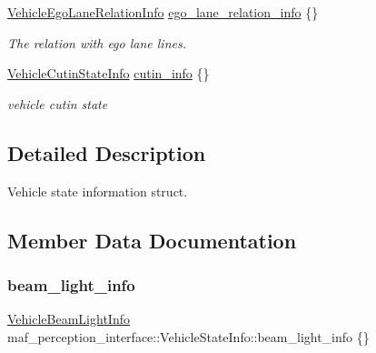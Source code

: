 \begin{DoxyCompactItemize}
\hyperlink{structmaf__perception__interface_1_1VehicleEgoLaneRelationInfo}{Vehicle\+Ego\+Lane\+Relation\+Info} \hyperlink{structmaf__perception__interface_1_1VehicleStateInfo_a336db2b29db8d0e7387dfa075b161c7f}{ego\+\_\+lane\+\_\+relation\+\_\+info} \{\}
\begin{DoxyCompactList}\small\item\em The relation with ego lane lines. \end{DoxyCompactList}\item 
\hyperlink{structmaf__perception__interface_1_1VehicleCutinStateInfo}{Vehicle\+Cutin\+State\+Info} \hyperlink{structmaf__perception__interface_1_1VehicleStateInfo_acc379f2e13a4f3c7ac26783fcc2c56c4}{cutin\+\_\+info} \{\}
\begin{DoxyCompactList}\small\item\em vehicle cutin state \end{DoxyCompactList}\end{DoxyCompactItemize}


\subsection{Detailed Description}
Vehicle state information struct. 

\subsection{Member Data Documentation}
\mbox{\label{structmaf__perception__interface_1_1VehicleStateInfo_a4f934009e30b51a0e345629e5dbebba8}} 
\subsubsection{\texorpdfstring{beam\+\_\+light\+\_\+info}{beam\_light\_info}}
{\footnotesize\ttfamily \hyperlink{structmaf__perception__interface_1_1VehicleBeamLightInfo}{Vehicle\+Beam\+Light\+Info} maf\+\_\+perception\+\_\+interface\+::\+Vehicle\+State\+Info\+::beam\+\_\+light\+\_\+info \{\}}



